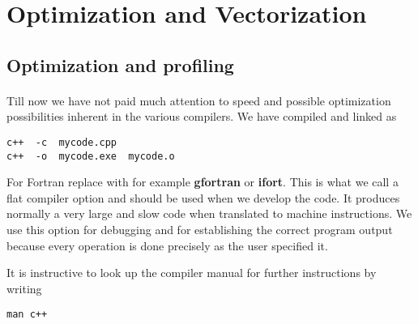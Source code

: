 \documentclass[%
oneside,                 %
final,                   %
10pt]{article}
\begin{document}

\newcommand{\exercisesection}[1]{\subsection*{#1}}



\section*{Optimization and Vectorization}

\subsection*{Optimization and profiling}

\paragraph{}

Till now we have not paid much attention to speed and possible optimization possibilities
inherent in the various compilers. We have compiled and linked as



\begin{verbatim}
c++  -c  mycode.cpp
c++  -o  mycode.exe  mycode.o

\end{verbatim}

For Fortran replace with for example \textbf{gfortran} or \textbf{ifort}.
This is what we call a flat compiler option and should be used when we develop the code.
It produces normally a very large and slow code when translated to machine instructions.
We use this option for debugging and for establishing the correct program output because
every operation is done precisely as the user specified it.

It is instructive to look up the compiler manual for further instructions by writing


\begin{verbatim}
man c++

\end{verbatim}
\end{document}
